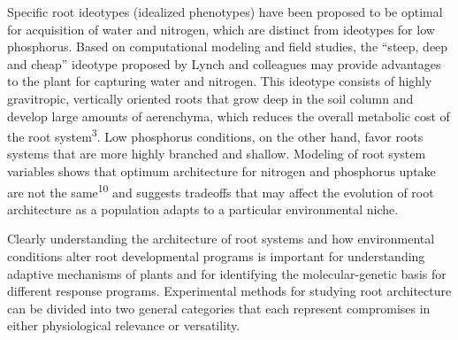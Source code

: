 \documentclass[]{article}
\begin{document}
Specific root ideotypes (idealized phenotypes) have been proposed to be
optimal for acquisition of water and nitrogen, which are distinct from
ideotypes for low phosphorus. Based on computational modeling and field
studies, the ``steep, deep and cheap'' ideotype proposed by Lynch and
colleagues may provide advantages to the plant for capturing water and
nitrogen. This ideotype consists of highly gravitropic, vertically
oriented roots that grow deep in the soil column and develop large
amounts of aerenchyma, which reduces the overall metabolic cost of the
root system\textsuperscript{3}. Low phosphorus conditions, on the other
hand, favor roots systems that are more highly branched and shallow.
Modeling of root system variables shows that optimum architecture for
nitrogen and phosphorus uptake are not the same\textsuperscript{10} and
suggests tradeoffs that may affect the evolution of root architecture as
a population adapts to a particular environmental niche.

Clearly understanding the architecture of root systems and how
environmental conditions alter root developmental programs is important
for understanding adaptive mechanisms of plants and for identifying the
molecular-genetic basis for different response programs. Experimental
methods for studying root architecture can be divided into two general
categories that each represent compromises in either physiological
relevance or versatility.
\end{document}

